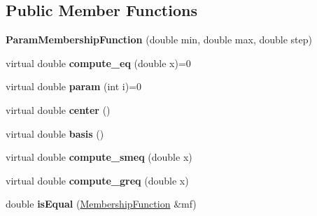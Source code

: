 \subsection*{Public Member Functions}
\begin{DoxyCompactItemize}
\item 
\hypertarget{classParamMembershipFunction_a5ac000073de42ac2e18a9704b0d87e2b}{
{\bfseries ParamMembershipFunction} (double min, double max, double step)}
\label{classParamMembershipFunction_a5ac000073de42ac2e18a9704b0d87e2b}

\item 
\hypertarget{classParamMembershipFunction_a47661b5de9109b9d7423e12fd88adb64}{
virtual double {\bfseries compute\_\-eq} (double x)=0}
\label{classParamMembershipFunction_a47661b5de9109b9d7423e12fd88adb64}

\item 
\hypertarget{classParamMembershipFunction_aca9b364a36939dd78a58cbe0fba7815d}{
virtual double {\bfseries param} (int i)=0}
\label{classParamMembershipFunction_aca9b364a36939dd78a58cbe0fba7815d}

\item 
\hypertarget{classParamMembershipFunction_afc59ebd7a5a8dca05e2486e20b52891a}{
virtual double {\bfseries center} ()}
\label{classParamMembershipFunction_afc59ebd7a5a8dca05e2486e20b52891a}

\item 
\hypertarget{classParamMembershipFunction_a54e9818d69a4e3d4104b7b37492615e2}{
virtual double {\bfseries basis} ()}
\label{classParamMembershipFunction_a54e9818d69a4e3d4104b7b37492615e2}

\item 
\hypertarget{classParamMembershipFunction_a750a9a843bd93fa495c652ed2b0ec33d}{
virtual double {\bfseries compute\_\-smeq} (double x)}
\label{classParamMembershipFunction_a750a9a843bd93fa495c652ed2b0ec33d}

\item 
\hypertarget{classParamMembershipFunction_a14f58c6eb02bf46329a388edd217acb3}{
virtual double {\bfseries compute\_\-greq} (double x)}
\label{classParamMembershipFunction_a14f58c6eb02bf46329a388edd217acb3}

\item 
\hypertarget{classParamMembershipFunction_a29e8a6b8ca62355ffdd72383ebb0e480}{
double {\bfseries isEqual} (\hyperlink{classMembershipFunction}{MembershipFunction} \&mf)}
\label{classParamMembershipFunction_a29e8a6b8ca62355ffdd72383ebb0e480}


\end{DoxyCompactItemize}
